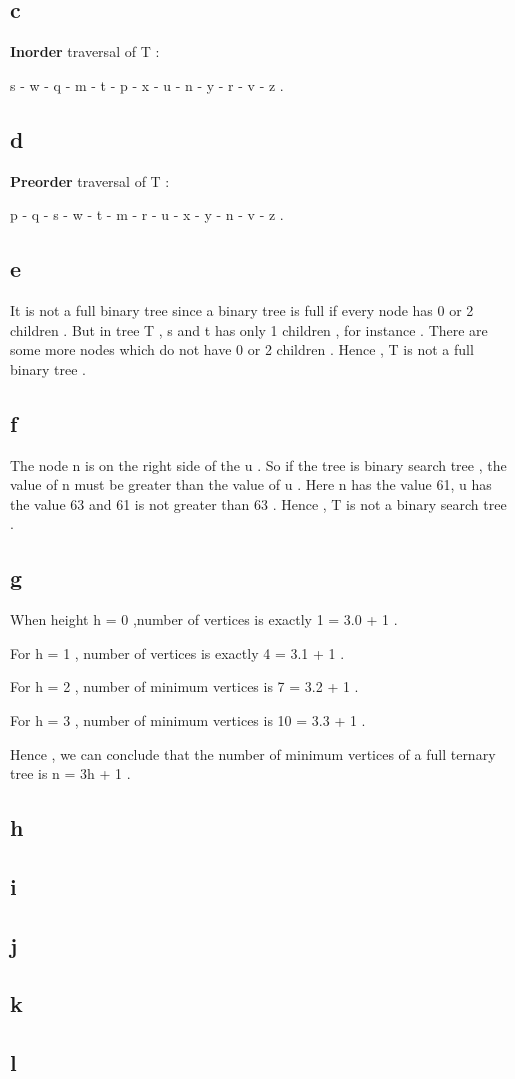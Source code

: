 \documentclass[11pt]{article}
\begin{document}
\subsection*{c}
\hspace{12px} \textbf{Inorder} traversal of T : \par s - w - q - m - t - p - x - u - n - y - r - v - z .
\subsection*{d} 
\hspace{12px} \textbf{Preorder} traversal of T : \par p - q - s - w - t - m - r - u - x - y - n - v - z .
\subsection*{e}
\hspace{12px} It is not a full binary tree since a binary tree is full if every node has 0 or 2 children . But in tree T , s and t has only 1 children , for instance . There are some more nodes which do not have 0 or 2 children . Hence , T is not a full binary tree . 
\subsection*{f}
\hspace{12px} The node n is on the right side of the u . So if the tree is binary search tree , the value of n must be greater than the value of u . Here n has the value 61, u has the value 63 and 61 is not greater than 63 . Hence , T is not a binary search tree .
\subsection*{g}
\hspace{12px} When height h = 0 ,number of vertices is exactly 1 = 3.0 + 1 . \par 
For h = 1 , number of vertices is exactly 4 = 3.1 + 1 . \par 
For h = 2 , number of minimum vertices is 7 = 3.2 + 1 . \par 
For h = 3 , number of minimum vertices is 10 = 3.3 + 1 . \par 
Hence , we can conclude that the number of minimum vertices of a full ternary tree is n = 3h + 1 .
\subsection*{h}
\subsection*{i}
\subsection*{j}
\subsection*{k}
\subsection*{l}
\end{document}
